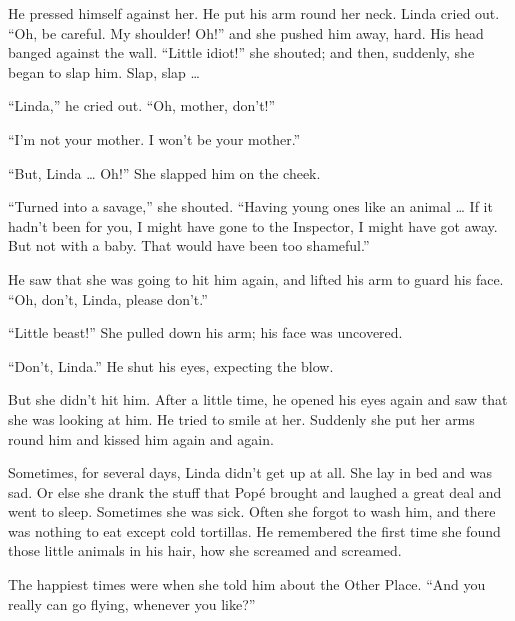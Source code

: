 \documentclass[12pt]{report}
\begin{document}
He pressed himself against her. He put his arm round her neck. Linda
cried out. ``Oh, be careful. My shoulder! Oh!'' and she pushed him away,
hard. His head banged against the wall. ``Little idiot!'' she shouted;
and then, suddenly, she began to slap him. Slap, slap \ldots{}

``Linda,'' he cried out. ``Oh, mother, don't!''

``I'm not your mother. I won't be your mother.''

``But, Linda \ldots{} Oh!'' She slapped him on the cheek.

``Turned into a savage,'' she shouted. ``Having young ones like an
animal \ldots{} If it hadn't been for you, I might have gone to the
Inspector, I might have got away. But not with a baby. That would have
been too shameful.''

He saw that she was going to hit him again, and lifted his arm to guard
his face. ``Oh, don't, Linda, please don't.''

``Little beast!'' She pulled down his arm; his face was uncovered.

``Don't, Linda.'' He shut his eyes, expecting the blow.

But she didn't hit him. After a little time, he opened his eyes again
and saw that she was looking at him. He tried to smile at her. Suddenly
she put her arms round him and kissed him again and again.

Sometimes, for several days, Linda didn't get up at all. She lay in bed
and was sad. Or else she drank the stuff that Popé brought and laughed a
great deal and went to sleep. Sometimes she was sick. Often she forgot
to wash him, and there was nothing to eat except cold tortillas. He
remembered the first time she found those little animals in his hair,
how she screamed and screamed.

The happiest times were when she told him about the Other Place. ``And
you really can go flying, whenever you like?''
\end{document}
